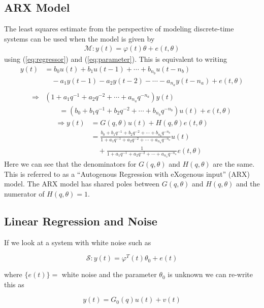 \subsection{ARX Model}
The least squares estimate from the perspective of modeling discrete-time systems can be used when the model is given by
\begin{align}
\mathcal{M}: y(t) = \varphi(t)\theta + e(t,\theta)
\end{align}
using (\ref{eq:regressor}) and (\ref{eq:parameter}).
This is equivalent to writing
\begin{align*}
y(t) &= b_0u(t) + b_1u(t-1) + \cdots + b_{n_b}u(t-n_b) \\
&\quad- a_1y(t-1) - a_2y(t-2) - \cdots - a_{n_a}y(t-n_a) + e(t,\theta) \\
\end{align*}
\begin{align*}
\Rightarrow &(1+a_1q^{-1}+a_2q^{-2}+\cdots+a_{n_a}q^{-n_a})y(t) \\
&\qquad = (b_0+b_1q^{-1}+b_2q^{-2}+\cdots+b_{n_b}q^{-n_b})u(t) + e(t,\theta)
\end{align*}
\begin{align*}
\Rightarrow y(t) &= G(q,\theta)u(t) + H(q,\theta)e(t,\theta) \\
&= \frac{b_0+b_1q^{-1}+b_2q^{-2}+\cdots+b_{n_b}q^{-n_b}}{1+a_1q^{-1}+a_2q^{-2}+\cdots+a_{n_a}q^{-n_a}}u(t) \\
&\quad + \frac{1}{1+a_1q^{-1}+a_2q^{-2}+\cdots+a_{n_a}q^{-n_a}}e(t,\theta)
\end{align*}
Here we can see that the denominators for $G(q,\theta)$ and $H(q,\theta)$ are the same.
This is referred to as a ``Autogenous Regression with eXogenous input'' (ARX) model.
The ARX model has shared poles between $G(q,\theta)$ and $H(q,\theta)$ and the numerator of $H(q,\theta)=1$.

\subsection{Linear Regression and Noise}
If we look at a system with white noise such as

\begin{equation*}
\mathcal{S}: y(t) = \varphi^T(t)\theta_0 + e(t)
\end{equation*}

where $\{e(t)\}=$ white noise and the parameter $\theta_0$ is unknown we can re-write this as

\begin{equation*}
y(t) = G_0(q)u(t) + v(t)
\end{equation*}

